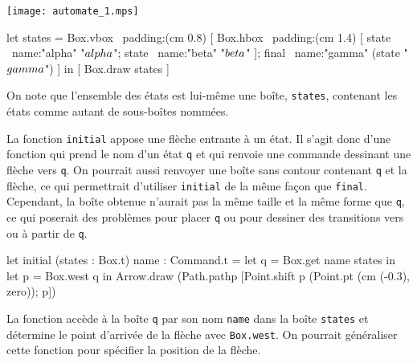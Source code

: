 \documentclass[twoside]{studia-Hermann}
\begin{document}
\begin{minipage}{0.2\linewidth}
  \texttt{[image: automate\_1.mps]}
\end{minipage}
\begin{minipage}{0.7\linewidth}
\begin{ocaml}
let states = Box.vbox ~padding:(cm 0.8)
  [ Box.hbox ~padding:(cm 1.4)
      [ state ~name:"alpha" "$\\alpha$";
        state ~name:"beta" "$\\beta$" ];
    final ~name:"gamma" 
      (state "$\\gamma$") ] in
[ Box.draw states ]
\end{ocaml}
\end{minipage}

\medskip\noindent On note que l'ensemble des états est lui-même une boîte,
\texttt{states}, contenant les états comme autant de sous-boîtes nommées.

La  fonction \texttt{initial} appose une  flèche entrante  à un
état.  Il  s'agit donc  d'une fonction  qui prend le nom d'un état
\texttt{q}  et qui 
renvoie une commande dessinant une  flèche vers \texttt{q}. On pourrait aussi
renvoyer une  boîte sans  contour contenant \texttt{q}  et la flèche,  ce qui
permettrait   d'utiliser  \texttt{initial}  de   la  même   façon  que
\texttt{final}.   Cependant, la  boîte  obtenue n'aurait  pas la  même
taille et  la même forme que  \texttt{q}, ce qui poserait  des problèmes pour
placer \texttt{q} ou pour dessiner des transitions vers ou à partir de
\texttt{q}. 
\begin{ocaml}
let initial (states : Box.t) name : Command.t =
  let q = Box.get name states in
  let p = Box.west q in
  Arrow.draw (Path.pathp 
    [Point.shift p (Point.pt (cm (-0.3), zero)); p])
\end{ocaml}
La fonction  accède à  la boîte \texttt{q}  par son  nom \texttt{name}
dans la  boîte \texttt{states} et détermine le point d'arrivée de la
flèche avec \texttt{Box.west}. On pourrait généraliser cette fonction
pour spécifier la position de la flèche.
\end{document}

